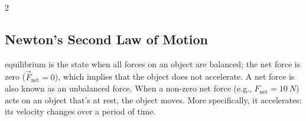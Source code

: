 \documentclass{article}
\numberwithin{equation}{section}
\numberwithin{figure}{section}
\begin{document}
\begin{multicols}{2}
\begin{center}
\end{center}

\end{multicols}

\clearpage 

\subsection{Newton's Second Law of Motion} \label{kkBUgj}

\Gls{equilibrium} is the state when all forces on an object are balanced; the net force is zero ($\vec{F}_{\text{net}} = 0$), which implies that the object does not accelerate. A net force is also known as an unbalanced force. When a non-zero net force (e.g., $F_{\text{net}} = \SI{10}{N}$) acts on an object that's at rest, the object moves. More specifically, it accelerates: its velocity changes over a period of time.
\end{document}
